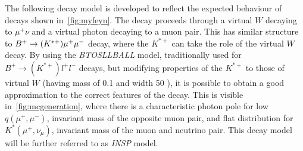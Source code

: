 The following decay model is developed to reflect the expected behaviour of decays shown in~\autoref{fig:myfeyn}. The decay proceeds through a virtual $W$ decaying to $\mu^{+} \nu$ and a virtual photon decaying to a muon pair. This has similar structure to ${B}^{+} \rightarrow (K^{*+}) \mu^{+} \mu^{-}$ decay, where the $K^{*+}$ can take the role of the virtual $W$ decay. By using the \textit{BTOSLLBALL} model\cite{Ali:1999mm}, traditionally used for $B^{+} \rightarrow (K^{*+}) l^{+} l^{-}$ decays, but modifying properties of the $K^{*+}$ to those of virtual $W$ (having mass of 0.1 \gevcc and width 50 \gev), it is possible to obtain a good approximation to the correct features of the decay. This is visible in~\autoref{fig:mcgeneration}, where there is a characteristic photon pole for low $q(\mu^{+},\mu^{-})$, invariant mass of the opposite muon pair, and flat distribution for $K^{*}(\mu^{+}, \nu_{\mu}) $, invariant mass of the muon and neutrino pair. This decay model will be further referred to as \textit{INSP} model. 




